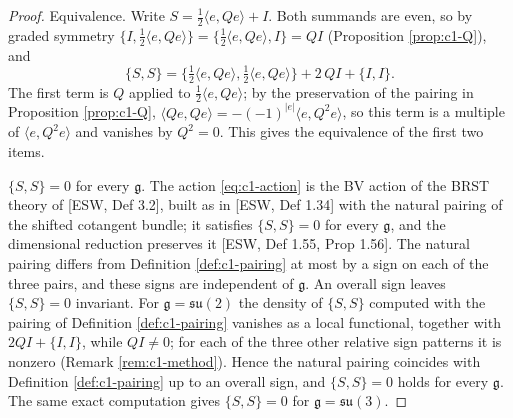 \begin{proof}
Equivalence. Write $S=\tfrac12\langle e,Qe\rangle+I$. Both summands are even, so by graded symmetry $\{I,\tfrac12\langle e,Qe\rangle\}=\{\tfrac12\langle e,Qe\rangle,I\}=QI$ (Proposition \ref{prop:c1-Q}), and
\[
\{S,S\}=\{\tfrac12\langle e,Qe\rangle,\tfrac12\langle e,Qe\rangle\}+2\,QI+\{I,I\}.
\]
The first term is $Q$ applied to $\tfrac12\langle e,Qe\rangle$; by the preservation of the pairing in Proposition \ref{prop:c1-Q}, $\langle Qe,Qe\rangle=-(-1)^{|e|}\langle e,Q^2e\rangle$, so this term is a multiple of $\langle e,Q^2e\rangle$ and vanishes by $Q^2=0$. This gives the equivalence of the first two items.

$\{S,S\}=0$ for every $\mathfrak g$. The action \eqref{eq:c1-action} is the BV action of the BRST theory of [ESW, Def 3.2], built as in [ESW, Def 1.34] with the natural pairing of the shifted cotangent bundle; it satisfies $\{S,S\}=0$ for every $\mathfrak g$, and the dimensional reduction preserves it [ESW, Def 1.55, Prop 1.56]. The natural pairing differs from Definition \ref{def:c1-pairing} at most by a sign on each of the three pairs, and these signs are independent of $\mathfrak g$. An overall sign leaves $\{S,S\}=0$ invariant. For $\mathfrak g=\mathfrak{su}(2)$ the density of $\{S,S\}$ computed with the pairing of Definition \ref{def:c1-pairing} vanishes as a local functional, together with $2QI+\{I,I\}$, while $QI\neq0$; for each of the three other relative sign patterns it is nonzero (Remark \ref{rem:c1-method}). Hence the natural pairing coincides with Definition \ref{def:c1-pairing} up to an overall sign, and $\{S,S\}=0$ holds for every $\mathfrak g$. The same exact computation gives $\{S,S\}=0$ for $\mathfrak g=\mathfrak{su}(3)$.


\end{proof}
